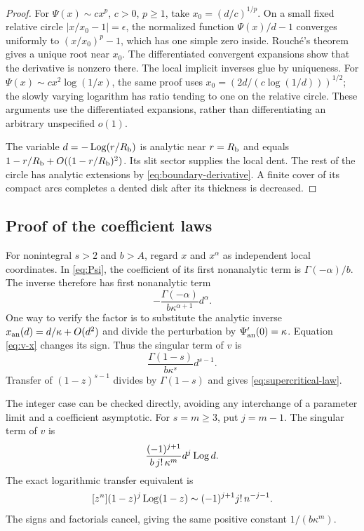 \begin{proof}
For $\Psi(x)\sim c x^p$, $c>0$, $p\ge1$, take
$x_0=(d/c)^{1/p}$.  On a small fixed relative circle
$|x/x_0-1|=\epsilon$, the normalized function $\Psi(x)/d-1$
converges uniformly to $(x/x_0)^p-1$, which has one simple zero
inside.  Rouch\'e's theorem gives a unique root near $x_0$.
The differentiated convergent expansions show that the derivative
is nonzero there.  The local implicit inverses glue by uniqueness.
For $\Psi(x)\sim c x^2\log(1/x)$, the same proof uses
$x_0=(2d/(c\log(1/d)))^{1/2}$; the slowly varying logarithm has
ratio tending to one on the relative circle.  These arguments
use the differentiated expansions, rather than differentiating an
arbitrary unspecified $o(1)$.

The variable $d=-\operatorname{Log}(r/R_{\mathrm b})$ is analytic near $r=R_{\mathrm b}$ and equals
$1-r/R_{\mathrm b}+O((1-r/R_{\mathrm b})^2)$.  Its slit sector supplies the local
dent.  The rest of the circle has analytic extensions by
\eqref{eq:boundary-derivative}.  A finite cover of its compact
arcs completes a dented disk after its thickness is decreased.
\end{proof}

\subsection{Proof of the coefficient laws}

For nonintegral $s>2$ and $b>A$, regard $x$ and $x^\alpha$ as
independent local coordinates.  In \eqref{eq:Psi}, the coefficient
of its first nonanalytic term is $\Gamma(-\alpha)/b$.
The inverse therefore has first nonanalytic term
\[
 -\frac{\Gamma(-\alpha)}{b\kappa^{\alpha+1}}d^\alpha.
\]
One way to verify the factor is to substitute the analytic inverse
$x_{\rm an}(d)=d/\kappa+O(d^2)$ and divide the perturbation by
$\Psi'_{\rm an}(0)=\kappa$.  Equation \eqref{eq:v-x} changes its
sign.  Thus the singular term of $v$ is
\begin{equation}\label{eq:super-singular}
 \frac{\Gamma(1-s)}{b\kappa^s}d^{s-1}.
\end{equation}
Transfer of $(1-z)^{s-1}$ divides by $\Gamma(1-s)$ and gives
\eqref{eq:supercritical-law}.

The integer case can be checked directly, avoiding any interchange
of a parameter limit and a coefficient asymptotic.  For $s=m\ge3$,
put $j=m-1$.  The singular term of $v$ is
\begin{equation}\label{eq:integer-super-singular}
 \frac{(-1)^{j+1}}{b\,j!\,\kappa^m}d^j\operatorname{Log} d.
\end{equation}
The exact logarithmic transfer equivalent is
\[
 [z^{n}] (1-z)^j\operatorname{Log}(1-z)
 \sim(-1)^{j+1}j!\,n^{-j-1}.
\]
The signs and factorials cancel, giving the same positive constant
$1/(b\kappa^m)$.

